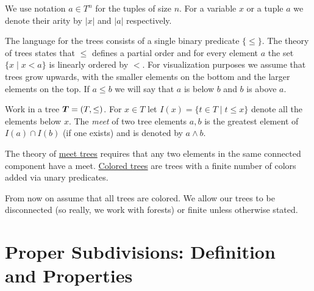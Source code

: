 \documentclass{amsart}
\DeclareMathOperator{\TT}{\boldface T}
\newcommand{\defn}{\underline}
\begin{document}
We use notation $a \in T^n$ for the tuples of size $n$. For a variable $x$ or a tuple $a$ we denote their arity by $|x|$ and $|a|$ respectively.

The language for the trees consists of a single binary predicate $\{\leq\}$. The theory of trees states that $\leq$ defines a partial order and for every element $a$ the set $\{x \mid x < a\}$ is linearly ordered by $<$. For visualization purposes we assume that trees grow upwards, with the smaller elements on the bottom and the larger elements on the top. If $a \leq b$ we will say that $a$ is below $b$ and $b$ is above $a$.

\begin{Definition}
  Work in a tree $\TT = (T, \leq)$.
  For $x \in T$ let $I(x) = \{t \in T \mid t \leq x\}$ denote all the elements below $x$.
  The \emph{meet} of two tree elements $a,b$ is the greatest element of $I(a) \cap I(b)$ (if one exists) and is denoted by $a \wedge b$.
\end{Definition}

The theory of \defn{meet trees} requires that any two elements in the same connected component have a meet. \defn{Colored trees} are trees with a finite number of colors added via unary predicates.

From now on assume that all trees are colored.
We allow our trees to be disconnected (so really, we work with forests) or finite unless otherwise stated.




\section{Proper Subdivisions: Definition and Properties}
\end{document}
